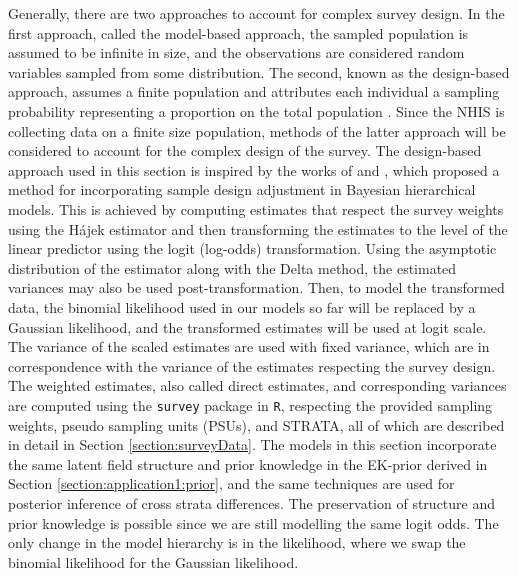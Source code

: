 Generally, there are two approaches to account for complex survey design. In the first approach, called the model-based approach, the sampled population is assumed to be infinite in size, and the observations are considered random variables sampled from some distribution. The second, known as the design-based approach, assumes a finite population and attributes each individual a sampling probability representing a proportion on the total population \citep{fuglstad2021two}. Since the NHIS is collecting data on a finite size population, methods of the latter approach will be considered to account for the complex design of the survey. The design-based approach used in this section is inspired by the works of \cite{SurveyDesignMercer} and \cite{hajekVariance}, which proposed a method for incorporating sample design adjustment in Bayesian hierarchical models. This is achieved by computing estimates that respect the survey weights using the Hájek estimator \citep{hajek1971comment} and then transforming the estimates to the level of the linear predictor using the logit (log-odds) transformation. Using the asymptotic distribution of the estimator along with the Delta method, the estimated variances may also be used post-transformation. Then, to model the transformed data, the binomial likelihood used in our models so far will be replaced by a Gaussian likelihood, and the transformed estimates will be used at logit scale. The variance of the scaled estimates are used with fixed variance, which are in correspondence with the variance of the estimates respecting the survey design. The weighted estimates, also called direct estimates, and corresponding variances are computed using the \texttt{survey} package \citep{Rsurvey} in \texttt{R}, respecting the provided sampling weights, pseudo sampling units (PSUs), and STRATA, all of which are described in detail in Section \ref{section:surveyData}. The models in this section incorporate the same latent field structure and prior knowledge in the EK-prior derived in Section \ref{section:application1:prior}, and the same techniques are used for posterior inference of cross strata differences. The preservation of structure and prior knowledge is possible since we are still modelling the same logit odds. The only change in the model hierarchy is in the likelihood, where we swap the binomial likelihood for the Gaussian likelihood. 

